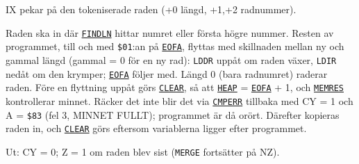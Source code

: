 \begin{Listing}
\Gap
{}
\begin{Note}\par\noindent IX pekar på den tokeniserade raden (+0 längd, +1,+2 radnummer).\par
\par\noindent Raden ska in där \hyperlink{l:FINDLN}{\texttt{FINDLN}} hittar numret eller första högre nummer. Resten av programmet, till och med \texttt{\$01}:an på \hyperlink{v:EOFA}{\texttt{EOFA}}, flyttas med skillnaden mellan ny och gammal längd (gammal = 0 för en ny rad): \texttt{LDDR} uppåt om raden växer, \texttt{LDIR} nedåt om den krymper; \hyperlink{v:EOFA}{\texttt{EOFA}} följer med. Längd 0 (bara radnumret) raderar raden. Före en flyttning uppåt görs \hyperlink{l:CLEAR}{\texttt{CLEAR}}, så att \hyperlink{v:HEAP}{\texttt{HEAP}} = \hyperlink{v:EOFA}{\texttt{EOFA}} + 1, och \hyperlink{l:MEMRES}{\texttt{MEMRES}} kontrollerar minnet. Räcker det inte blir det via \hyperlink{l:CMPERR}{\texttt{CMPERR}} tillbaka med CY = 1 och A = \texttt{\$83} (fel 3, MINNET FULLT); programmet är då orört. Därefter kopieras raden in, och \hyperlink{l:CLEAR}{\texttt{CLEAR}} görs eftersom variablerna ligger efter programmet.\par
\par\noindent Ut: CY = 0; Z = 1 om raden blev sist (\texttt{MERGE} fortsätter på NZ).\par\end{Note}

\end{Listing}
